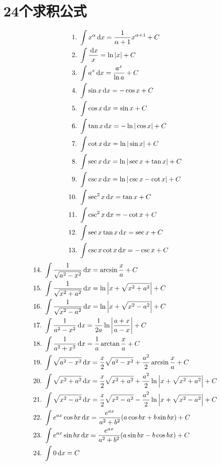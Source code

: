 \chapter{24个求积公式}
\begin{spacing}{1.8}
\begin{align*}
  \text{1.\ } & \int x^\alpha \,\mathrm{d} x = \frac{1}{\alpha+1}x^{\alpha+1}+C \\
  \text{2.\ } & \int \frac{\,\mathrm{d} x}{x} = \ln |x| +C\\
  \text{3.\ } & \int a^x \,\mathrm{d} x = \frac{a^x}{\ln a} +C\\
  \text{4.\ } & \int \sin x \,\mathrm{d} x = -\cos x + C\\
  \text{5.\ } & \int \cos x \,\mathrm{d} x = \sin x +C\\
  \text{6.\ } & \int \tan x \,\mathrm{d} x = -\ln |\cos x|+C\\
  \text{7.\ } & \int \cot x \,\mathrm{d} x = \ln |\sin x|+C\\
  \text{8.\ } & \int \sec x \,\mathrm{d} x = \ln|\sec x + \tan x|+C\\
  \text{9.\ } & \int \csc x \,\mathrm{d} x = \ln|\csc x - \cot x|+C\\
  \text{10.\ } & \int \sec^2 x \,\mathrm{d} x = \tan x +C\\
  \text{11.\ } & \int \csc^2 x \,\mathrm{d} x = -\cot x +C\\
  \text{12.\ } & \int \sec x \tan x \,\mathrm{d} x = \sec x +C\\
  \text{13.\ } & \int \csc x \cot x \,\mathrm{d} x = -\csc x +C
\end{align*}
\begin{align*}
  \text{14.\ } & \int \frac{1}{\sqrt{a^2-x^2}} \,\mathrm{d} x = \arcsin \frac{x}{a}+C\\
  \text{15.\ } & \int \frac{1}{\sqrt{x^2+a^2}} \,\mathrm{d} x = \ln \left|x+\sqrt{x^2+a^2}\right| +C\\
  \text{16.\ } & \int \frac{1}{\sqrt{x^2-a^2}} \,\mathrm{d} x = \ln \left|x+\sqrt{x^2-a^2}\right| +C\\
  \text{17.\ } & \int \frac{1}{a^2-x^2} \,\mathrm{d} x = \frac{1}{2a}\ln \left|\frac{a+x}{a-x}\right| + C\\
  \text{18.\ } & \int \frac{1}{a^2+x^2} \,\mathrm{d} x = \frac{1}{a}\arctan \frac{x}{a}+ C\\
  \text{19.\ } & \int \sqrt{a^2-x^2} \,\mathrm{d} x = \frac{x}{2}\sqrt{a^2-x^2}+\frac{a^2}{2}\arcsin \frac{x}{a}+C\\
  \text{20.\ } & \int \sqrt{x^2+a^2} \,\mathrm{d} x = \frac{x}{2}\sqrt{x^2+a^2}+\frac{a^2}{2} \ln \left|x+\sqrt{x^2+a^2}\right|+C\\
  \text{21.\ } & \int \sqrt{x^2-a^2} \,\mathrm{d} x = \frac{x}{2}\sqrt{x^2-a^2}-\frac{a^2}{2} \ln \left|x+\sqrt{x^2-a^2}\right|+C\\  
  \text{22.\ } & \int e^{ax}\cos bx \,\mathrm{d} x = \frac{e^{ax}}{a^2+b^2}(a\cos bx+ b\sin bx) +C\\
  \text{23.\ } & \int e^{ax}\sin bx \,\mathrm{d} x = \frac{e^{ax}}{a^2+b^2}(a\sin bx- b\cos bx) +C\\
  \text{24.\ } & \int 0 \,\mathrm{d} x = C
\end{align*}
\end{spacing} 